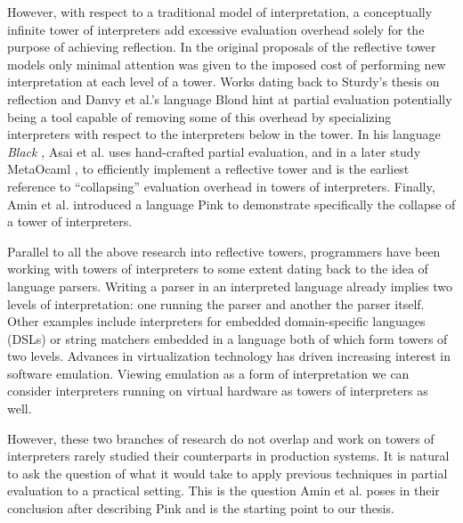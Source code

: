 \documentclass[a4paper,12pt,twoside,openright]{report}
\theoremstyle{definition}
\begin{document}
However, with respect to a traditional model of interpretation, a conceptually infinite tower of interpreters add excessive evaluation overhead solely for the purpose of achieving reflection. In the original proposals of the reflective tower models only minimal attention was given to the imposed cost of performing new interpretation at each level of a tower. Works dating back to Sturdy's thesis on reflection \cite{sturdy1993lisp} and Danvy et al.'s language Blond \cite{danvy1988intensions} hint at partial evaluation potentially being a tool capable of removing some of this overhead by specializing interpreters with respect to the interpreters below in the tower. In his language \textit{Black} \cite{asai1996duplication}, Asai et al. uses hand-crafted partial evaluation, and in a later study MetaOcaml \cite{asai2015compiling}, to efficiently implement a reflective tower and is the earliest reference to ``collapsing'' evaluation overhead in towers of interpreters. Finally, Amin et al. introduced a language Pink \cite{amin2017collapsing} to demonstrate specifically the collapse of a tower of interpreters.

Parallel to all the above research into reflective towers, programmers have been working with towers of interpreters to some extent dating back to the idea of language parsers. Writing a parser in an interpreted language already implies two levels of interpretation: one running the parser and another the parser itself. Other examples include interpreters for embedded domain-specific languages (DSLs) or string matchers embedded in a language both of which form towers of two levels. Advances in virtualization technology has driven increasing interest in software emulation. Viewing emulation as a form of interpretation we can consider interpreters running on virtual hardware as towers of interpreters as well.

However, these two branches of research do not overlap and work on towers of interpreters rarely studied their counterparts in production systems. It is natural to ask the question of what it would take to apply previous techniques in partial evaluation to a practical setting. This is the question Amin et al. poses in their conclusion after describing Pink \cite{amin2017collapsing} and is the starting point to our thesis.
\end{document}
